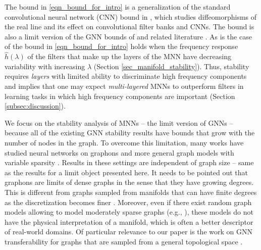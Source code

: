 The bound in \eqref{eqn_bound_for_intro} is a generalization of the standard convolutional neural network (CNN) bound in \cite{mallat2012group}, which studies diffeomorphisms of the real line and its effect on convolutional filter banks and CNNs. The bound is also a limit version of the GNN bounds of \cite{gama2020stability} and related literature \cite{gama2019stability, verma2019stability, zou2020graph, ruiz2021graph, ruiz2021graphon}. As is the case of \cite{mallat2012group, gama2020stability, gama2019stability, verma2019stability, zou2020graph, ruiz2021graph, ruiz2021graphon} the bound in \eqref{eqn_bound_for_intro} holds when the frequency response $\hat{h}(\lambda)$ of the filters that make up the layers of the MNN have decreasing variability with increasing $\lambda$ (Section \ref{sec_manifold_stability}). Thus, stability requires \emph{layers} with limited ability to discriminate high frequency components and implies that one may expect \emph{multi-layered} MNNs to outperform filters in learning tasks in which high frequency components are important (Section \ref{subsec:discussion}).

 We focus on the stability analysis of MNNs -- the limit version of GNNs -- because all of the existing GNN stability results have bounds that grow with the number of nodes \cite{gama2019stability, ruiz2021graph} in the graph. To overcome this limitation, many works have studied neural networks on graphons \cite{ruiz2021graphon, maskey2021transferability, ruiz2021transferability} and more general graph models with variable sparsity \cite{keriven2020convergence}. Results in these settings are independent of graph size – same as the results for a limit object presented here. It needs to be pointed out that graphons are limits of dense graphs in the sense that they have growing degrees. This is different from graphs sampled from manifolds that can have finite degrees as the discretization becomes finer \cite{calder2019improved}. Moreover, even if there exist random graph models allowing to model moderately sparse graphs (e.g., \cite{keriven2020convergence}), these models do not have the physical interpretation of a manifold, which is often a better descriptor of real-world domains.
Of particular relevance to our paper is the work on GNN transferability for graphs that are sampled from a general topological space \cite{levie2019transferability}. 





